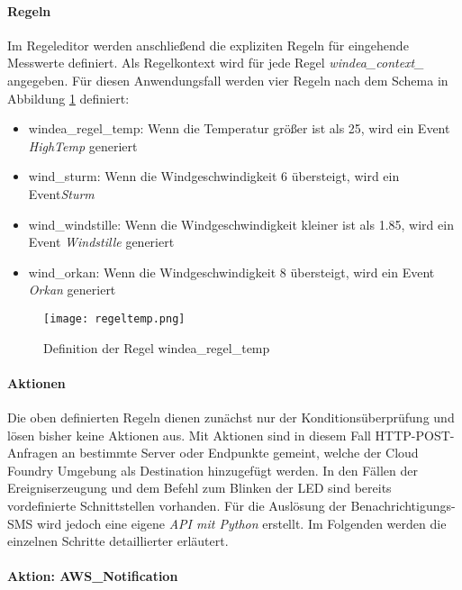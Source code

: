 \paragraph{Regeln} Im Regeleditor werden anschließend die expliziten Regeln für eingehende Messwerte definiert. Als Regelkontext wird für jede Regel \textit{windea\_context\_} angegeben. Für diesen Anwendungsfall werden vier Regeln nach dem Schema in Abbildung \ref{rules} definiert:
\begin{itemize}
  \item windea\_regel\_temp: Wenn die Temperatur größer ist als 25, wird ein Event \textit{HighTemp} generiert
  \item wind\_sturm: Wenn die Windgeschwindigkeit 6 übersteigt, wird ein Event\textit{Sturm}
  \item wind\_windstille: Wenn die Windgeschwindigkeit kleiner ist als 1.85, wird ein Event \textit{Windstille} generiert
  \item wind\_orkan: Wenn die Windgeschwindigkeit 8 übersteigt, wird ein Event \textit{Orkan} generiert
\end{itemize}

\begin{figure} [H]
  \centering
  \texttt{[image: regeltemp.png]}
  \caption[Definition einer Regel]{Definition der Regel windea\_regel\_temp}
  \label{rules}
\end{figure}

\paragraph{Aktionen}

Die oben definierten Regeln dienen zunächst nur der Konditionsüberprüfung und lösen bisher keine Aktionen aus. Mit Aktionen sind in diesem Fall HTTP-POST-Anfragen an bestimmte Server oder Endpunkte gemeint, welche der Cloud Foundry Umgebung als Destination hinzugefügt werden. In den Fällen der Ereigniserzeugung und dem Befehl zum Blinken der LED sind bereits vordefinierte Schnittstellen vorhanden. Für die Auslösung der Benachrichtigungs-SMS wird jedoch eine eigene \textit{API mit Python} erstellt. Im Folgenden werden die einzelnen Schritte detaillierter erläutert.

\paragraph{Aktion: AWS\_Notification}

